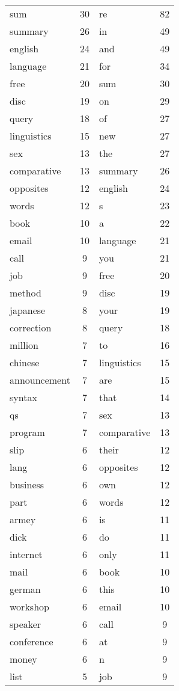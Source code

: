 \documentclass[10pt, a4paper]{article}
\begin{document}
\begin{tabular}{l c l c}
sum & 30 & re & 82 \\
summary & 26 & in & 49 \\
english & 24 & and & 49 \\
language & 21 & for & 34 \\
free & 20 & sum & 30 \\
disc & 19 & on & 29 \\
query & 18 & of & 27 \\
linguistics & 15 & new & 27 \\
sex & 13 & the & 27 \\
comparative & 13 & summary & 26 \\
opposites & 12 & english & 24 \\
words & 12 & s & 23 \\
book & 10 & a & 22 \\
email & 10 & language & 21 \\
call & 9 & you & 21 \\
job & 9 & free & 20 \\
method & 9 & disc & 19 \\
japanese & 8 & your & 19 \\
correction & 8 & query & 18 \\
million & 7 & to & 16 \\
chinese & 7 & linguistics & 15 \\
announcement & 7 & are & 15 \\
syntax & 7 & that & 14 \\
qs & 7 & sex & 13 \\
program & 7 & comparative & 13 \\
slip & 6 & their & 12 \\
lang & 6 & opposites & 12 \\
business & 6 & own & 12 \\
part & 6 & words & 12 \\
armey & 6 & is & 11 \\
dick & 6 & do & 11 \\
internet & 6 & only & 11 \\
mail & 6 & book & 10 \\
german & 6 & this & 10 \\
workshop & 6 & email & 10 \\
speaker & 6 & call & 9 \\
conference & 6 & at & 9 \\
money & 6 & n & 9 \\
list & 5 & job & 9 \\

\end{tabular}
\end{document}

